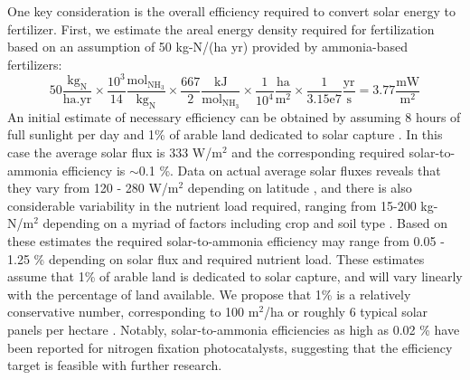 One key consideration is the overall efficiency required to convert solar energy to fertilizer. First, we estimate the areal energy density required for fertilization based on an assumption of 50 kg-N/(ha yr) provided by ammonia-based fertilizers:
\begin{equation}
\mathrm{
50 \frac{kg_N}{ha . yr} \times \frac{10^3}{14} \frac{mol_{NH_3}}{kg_N} \times \frac{667}{2} \frac{kJ}{mol_{NH_3}} \times \frac{1}{10^4} \frac{ha}{m^2} \times \frac{1}{3.15e7} \frac{yr}{s} = 3.77 \frac{mW}{m^2}
}
\end{equation}
An initial estimate of necessary efficiency can be obtained by assuming 8 hours of full sunlight per day and 1\% of arable land dedicated to solar capture \cite{Medford_2017}. In this case the average solar flux is 333 W/m$^2$ and the corresponding required solar-to-ammonia efficiency is $\sim$0.1 \%. Data on actual average solar fluxes reveals that they vary from 120 - 280 W/m$^2$ depending on latitude \cite{MacKay_2013}, and there is also considerable variability in the nutrient load required, ranging from 15-200 kg-N/m$^2$ depending on a myriad of factors including crop and soil type \needcite. Based on these estimates the required solar-to-ammonia efficiency may range from 0.05 - 1.25 \% depending on solar flux and required nutrient load. These estimates assume that 1\% of arable land is dedicated to solar capture, and will vary linearly with the percentage of land available. We propose that 1\% is a relatively conservative number, corresponding to 100 m$^2$/ha or roughly 6 typical solar panels per hectare \needcite. Notably, solar-to-ammonia efficiencies as high as 0.02 \% have been reported for nitrogen fixation photocatalysts, suggesting that the efficiency target is feasible with further research.\cite{Hirakawa_2017} \needcite

